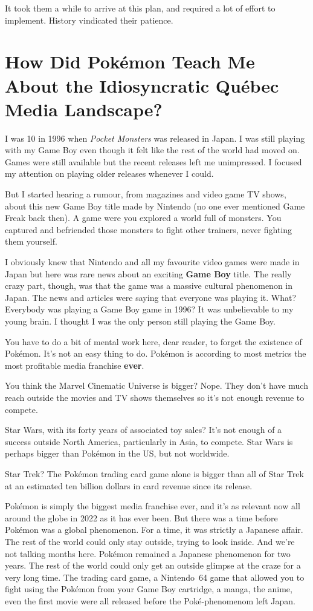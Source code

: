 \documentclass{book}
\begin{document}
It took them a while to arrive at this plan, and required a lot of effort to implement. History vindicated their patience.

\FloatBarrier\needspace{5pt}\section*{How Did Pokémon Teach Me About the Idiosyncratic Québec Media Landscape?}\nopagebreak[4]

I was 10 in 1996 when \emph{Pocket Monsters} was released in Japan. I was still playing with my Game Boy even though it felt like the rest of the world had moved on. Games were still available but the recent releases left me unimpressed. I focused my attention on playing older releases whenever I could.

But I started hearing a rumour, from magazines and video game TV shows, about this new Game Boy title made by Nintendo (no one ever mentioned Game Freak back then). A game were you explored a world full of monsters. You captured and befriended those monsters to fight other trainers, never fighting them yourself.

I obviously knew that Nintendo and all my favourite video games were made in Japan but here was rare news about an exciting \textbf{Game Boy} title. The really crazy part, though, was that the game was a massive cultural phenomenon in Japan. The news and articles were saying that everyone was playing it. What? Everybody was playing a Game Boy game in 1996? It was unbelievable to my young brain. I thought I was the only person still playing the Game Boy.

You have to do a bit of mental work here, dear reader, to forget the existence of Pokémon. It’s not an easy thing to do. Pokémon is according to most metrics the most profitable media franchise \textbf{ever}.

You think the Marvel Cinematic Universe is bigger? Nope. They don’t have much reach outside the movies and TV shows themselves so it’s not enough revenue to compete.

Star Wars, with its forty years of associated toy sales? It’s not enough of a success outside North America, particularly in Asia, to compete. Star Wars is perhaps bigger than Pokémon in the US, but not worldwide.

Star Trek? The Pokémon trading card game alone is bigger than all of Star Trek at an estimated ten billion dollars in card revenue since its release.

Pokémon is simply the biggest media franchise ever, and it’s as relevant now all around the globe in 2022 as it has ever been. But there was a time before Pokémon was a global phenomenon. For a time, it was strictly a Japanese affair. The rest of the world could only stay outside, trying to look inside. And we’re not talking months here. Pokémon remained a Japanese phenomenon for two years. The rest of the world could only get an outside glimpse at the craze for a very long time. The trading card game, a Nintendo 64 game that allowed you to fight using the Pokémon from your Game Boy cartridge, a manga, the anime, even the first movie were all released before the Poké-phenomenom left Japan.
\end{document}
